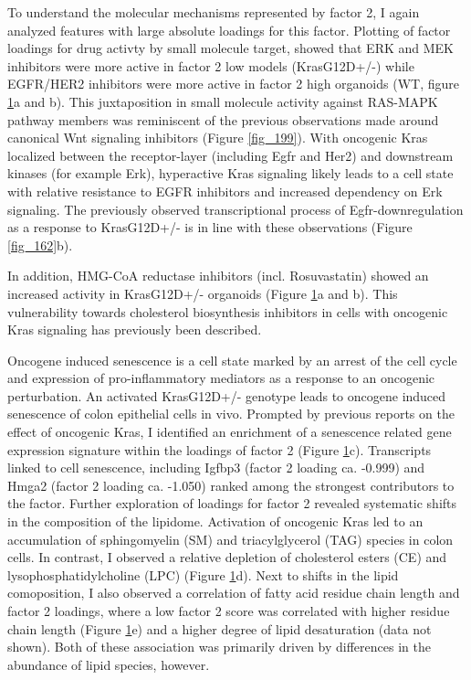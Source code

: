 \begin{flushleft}
\begin{figure}[h]
\label{fig_200}
\end{figure}

\smallbreak

To understand the molecular mechanisms represented by factor 2, I again analyzed features with large absolute loadings for this factor. Plotting of factor loadings for drug activty by small molecule target, showed that ERK and MEK inhibitors were more active in factor 2 low models (KrasG12D+/-) while EGFR/HER2 inhibitors were more active in factor 2 high organoids (WT, figure \ref{fig_200}a and b). This juxtaposition in small molecule activity against RAS-MAPK pathway members was reminiscent of the previous observations made around canonical Wnt signaling inhibitors (Figure \ref{fig_199}). With oncogenic Kras localized between the receptor-layer (including Egfr and Her2) and downstream kinases (for example Erk), hyperactive Kras signaling likely leads to a cell state with relative resistance to EGFR inhibitors and increased dependency on Erk signaling. The previously observed transcriptional process of Egfr-downregulation as a response to KrasG12D+/- is in line with these observations (Figure \ref{fig_162}b).

\smallbreak

In addition, HMG-CoA reductase inhibitors (incl. Rosuvastatin) showed an increased activity in KrasG12D+/- organoids (Figure \ref{fig_200}a and b). This vulnerability towards cholesterol biosynthesis inhibitors in cells with oncogenic Kras signaling has previously been described. 

\smallbreak

Oncogene induced senescence is a cell state marked by an arrest of the cell cycle and expression of pro-inflammatory mediators as a response to an oncogenic perturbation. An activated KrasG12D+/- genotype leads to oncogene induced senescence of colon epithelial cells in vivo. 
Prompted by previous reports on the effect of oncogenic Kras, I identified an enrichment of a senescence related gene expression signature within the loadings of factor 2 (Figure \ref{fig_200}c). Transcripts linked to cell senescence, including Igfbp3 (factor 2 loading ca. -0.999) and Hmga2 (factor 2 loading ca. -1.050) ranked among the strongest contributors to the factor. 
Further exploration of loadings for factor 2 revealed systematic shifts in the composition of the lipidome. Activation of oncogenic Kras led to an accumulation of sphingomyelin (SM) and triacylglycerol (TAG) species in colon cells. In contrast, I observed a relative depletion of cholesterol esters (CE) and lysophosphatidylcholine (LPC) (Figure \ref{fig_200}d). Next to shifts in the lipid comoposition, I also observed a correlation of fatty acid residue chain length and factor 2 loadings, where a low factor 2 score was correlated with higher residue chain length (Figure \ref{fig_200}e) and a higher degree of lipid desaturation (data not shown). Both of these association was primarily driven by differences in the abundance of lipid species, however. 


\end{flushleft}
